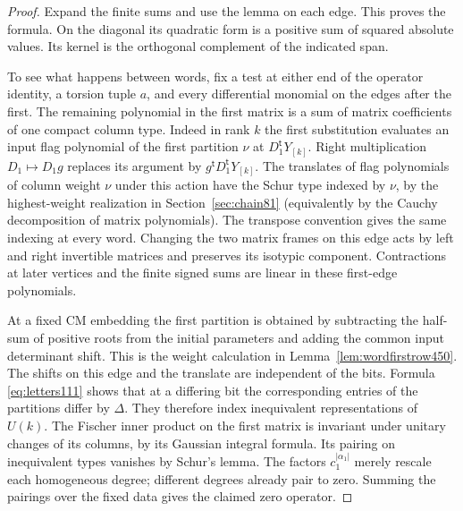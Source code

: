 \documentclass[a4paper,11pt]{article}
\theoremstyle{definition}
\theoremstyle{remark}
\numberwithin{equation}{section}
\begin{document}
\begin{proof}
Expand the finite sums and use the lemma on each edge. This proves
the formula. On the diagonal its quadratic form is a positive sum
of squared absolute values. Its kernel is the orthogonal complement
of the indicated span.

To see what happens between words, fix a test at either end of
the operator identity, a torsion tuple \(a\), and every
differential monomial on the edges after the first. The remaining
polynomial in the first matrix is a sum of matrix coefficients of
one compact column type. Indeed in rank \(k\) the first substitution
evaluates an input flag polynomial of the first partition \(\nu\)
at \(D_1^{\mathsf t}Y_{[k]}\). Right multiplication \(D_1\mapsto
D_1g\) replaces its argument by \(g^{\mathsf t}D_1^{\mathsf t}Y_{[k]}\).
The translates of flag polynomials of column weight \(\nu\) under
this action have the Schur type indexed by \(\nu\), by the
highest-weight realization in Section~\ref{sec:chain81} (equivalently
by the Cauchy decomposition of matrix polynomials). The transpose
convention gives the same indexing at every word. Changing the
two matrix frames on this edge acts by left and right invertible
matrices and preserves its isotypic component. Contractions at
later vertices and the finite signed sums are linear in these
first-edge polynomials.

At a fixed CM embedding the first partition is obtained by
subtracting the half-sum of positive roots from the initial
parameters and adding the common input determinant shift. This
is the weight calculation in Lemma~\ref{lem:wordfirstrow450}.
The shifts on this edge and the translate are independent of the
bits. Formula \eqref{eq:letters111} shows that at a differing bit
the corresponding entries of the partitions differ by \(\Delta\).
They therefore index inequivalent representations of \(U(k)\).
The Fischer inner product on the first matrix is invariant under
unitary changes of its columns, by its Gaussian integral formula.
Its pairing on inequivalent types vanishes by Schur's lemma.
The factors \(c_1^{|\alpha_1|}\) merely rescale each homogeneous
degree; different degrees already pair to zero. Summing the
pairings over the fixed data gives the claimed zero operator.
\end{proof}
\end{document}
